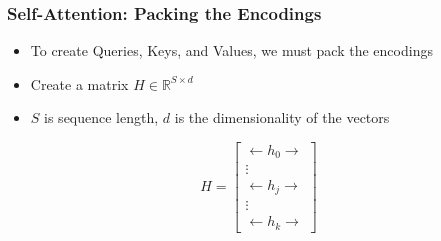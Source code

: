\documentclass[usenames,dvipsnames]{beamer}
\begin{document}
\begin{frame}
  \frametitle{Self-Attention: Packing the Encodings}
  \begin{itemize}
    \item To create Queries, Keys, and Values, we must pack the encodings
    \item Create a matrix $H \in \mathbb{R}^{S \times d}$
    \item $S$ is sequence length, $d$ is the dimensionality of the vectors
  \end{itemize}
  \begin{equation*}
    H = \begin{bmatrix}
    \longleftarrow h_0 \longrightarrow \\
    \vdots \\
    \longleftarrow h_j \longrightarrow  \\
    \vdots \\
    \longleftarrow h_k \longrightarrow
\end{bmatrix}
  \end{equation*}
\end{frame}
\end{document}
